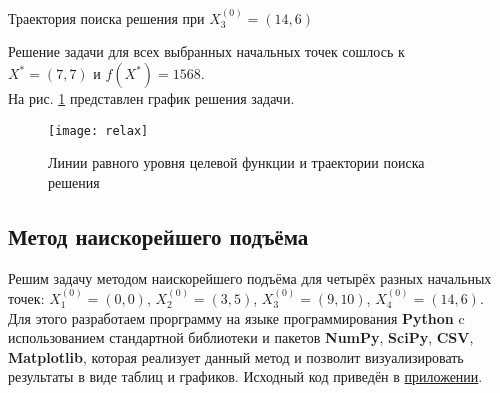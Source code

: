 \begin{table}[H]
\begin{center}
	\caption{Траектория поиска решения при $X_3^{(0)} = (14, 6)$}
	\label{tab:trajectory-relax-3}
	\def\tabcolsep{10pt}
	\def\arraystretch{1.23}
	\fontsize{13}{14}\selectfont
\end{center}
\end{table}

Решение задачи для всех выбранных начальных точек сошлось к\\ $X^* = (7, 7)$ и $f(X^*) = 1568$.\\

На рис. \ref{pic:relax} представлен график решения задачи.

\begin{figure}[H]
\begin{center}
	\texttt{[image: relax]}
	\caption{Линии равного уровня целевой функции и траектории поиска решения}
	\label{pic:relax}
\end{center}
\end{figure}


\subsection{Метод наискорейшего подъёма}

Решим задачу методом наискорейшего подъёма для четырёх разных начальных точек: $X_1^{(0)} = (0, 0)$, $X_2^{(0)} = (3, 5)$, $X_3^{(0)} = (9, 10)$, $X_4^{(0)} = (14, 6)$.\\

Для этого разработаем прорграмму на языке программирования \textbf{Python} c использованием стандартной библиотеки и пакетов \textbf{NumPy}, \textbf{SciPy}, \textbf{CSV}, \textbf{Matplotlib}, которая реализует данный метод и позволит визуализировать результаты в виде таблиц и графиков.  Исходный код приведён в \hyperref[sec:application]{приложении}.\\

